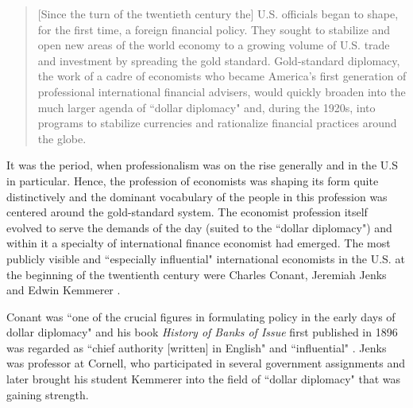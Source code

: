 \begin{quote}
[Since the turn of the twentieth century the] U.S. officials began to shape, for the first time, a foreign financial policy. They sought to stabilize and open new areas of the world economy to a growing volume of U.S. trade and investment by spreading the gold standard. Gold-standard diplomacy, the work of a cadre of economists who became America's first generation of professional international financial advisers, would quickly broaden into the much larger agenda of ``dollar diplomacy" and, during the 1920s, into programs to stabilize currencies and rationalize financial practices around the globe. \citep[p.~4]{rosenberg1999}
\end{quote}

It was the period, when professionalism was on the rise generally and in the U.S in particular. Hence, the profession of economists was shaping its form quite distinctively and the dominant vocabulary of the people in this profession was centered around the gold-standard system. The economist profession itself evolved to serve the demands of the day (suited to the ``dollar diplomacy") and within it a specialty of international finance economist had emerged. The most publicly visible and ``especially influential" international economists in the U.S. at the beginning of the twentienth century were Charles Conant, Jeremiah Jenks and Edwin Kemmerer \citep[p.~5]{rosenberg1999}.

Conant was ``one of the crucial figures in formulating policy in the early days of dollar diplomacy" and his book \textit{History of Banks of Issue} first published in 1896 was regarded as ``chief authority [written] in English" \citep[p.~887]{bankersm1908} and ``influential" \citep[p.~8]{schiltz2012}. Jenks was professor at Cornell, who participated in several government assignments and later brought his student Kemmerer into the field of ``dollar diplomacy" that was gaining strength. 

